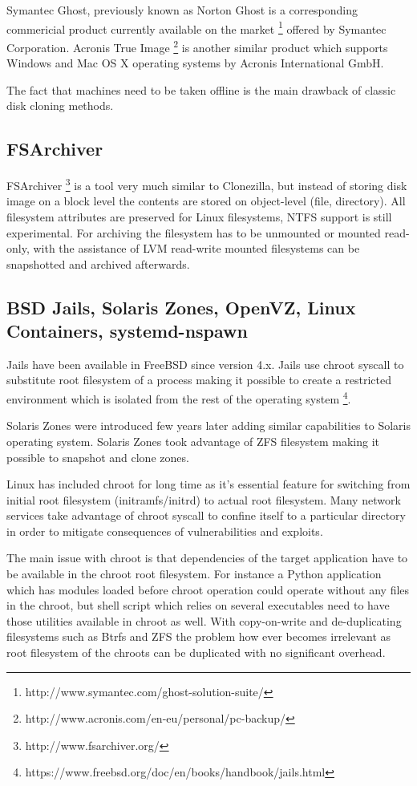 \documentclass[a4paper,11pt]{kth-mag}
\begin{document}
Symantec Ghost, previously known as Norton Ghost is a corresponding commericial
product currently available on the market
\footnote{http://www.symantec.com/ghost-solution-suite/}
offered by Symantec Corporation.
Acronis True Image
\footnote{http://www.acronis.com/en-eu/personal/pc-backup/}
is another similar product which supports Windows
and Mac OS X operating systems by Acronis International GmbH.

The fact that machines need to be taken offline is the main
drawback of classic disk cloning methods.

\subsection{FSArchiver}

FSArchiver
\footnote{http://www.fsarchiver.org/}
is a tool very much similar to Clonezilla,
but instead of storing disk image on a block level the
contents are stored on object-level (file, directory).
All filesystem attributes are preserved for Linux filesystems,
NTFS support is still experimental.
For archiving the filesystem has to be unmounted or mounted
read-only, with the assistance of LVM read-write mounted
filesystems can be snapshotted and archived afterwards.


\subsection{BSD Jails, Solaris Zones, OpenVZ, Linux Containers, systemd-nspawn}

Jails have been available in FreeBSD since version 4.x. Jails use chroot
syscall to substitute root filesystem of a process making it possible to
create a restricted environment which is isolated from the rest of the
operating system
\footnote{https://www.freebsd.org/doc/en/books/handbook/jails.html}.

Solaris Zones were introduced few years later adding similar
capabilities to Solaris operating system.
Solaris Zones took advantage of ZFS filesystem making it
possible to snapshot and clone zones.

Linux has included chroot for long time as it's essential feature for switching from initial root filesystem (initramfs/initrd) to actual root filesystem.
Many network services take advantage of chroot syscall to confine
itself to a particular directory in order to mitigate consequences
of vulnerabilities and exploits.

The main issue with chroot is that dependencies of the target
application have to be available in the chroot root filesystem.
For instance a Python application which has modules loaded before
chroot operation could operate without any files in the chroot,
but shell script which relies on several executables need to have
those utilities available in chroot as well.
With copy-on-write and de-duplicating filesystems such as Btrfs and
ZFS the problem how ever becomes irrelevant as root
filesystem of the chroots can be duplicated with no significant overhead.
\end{document}
